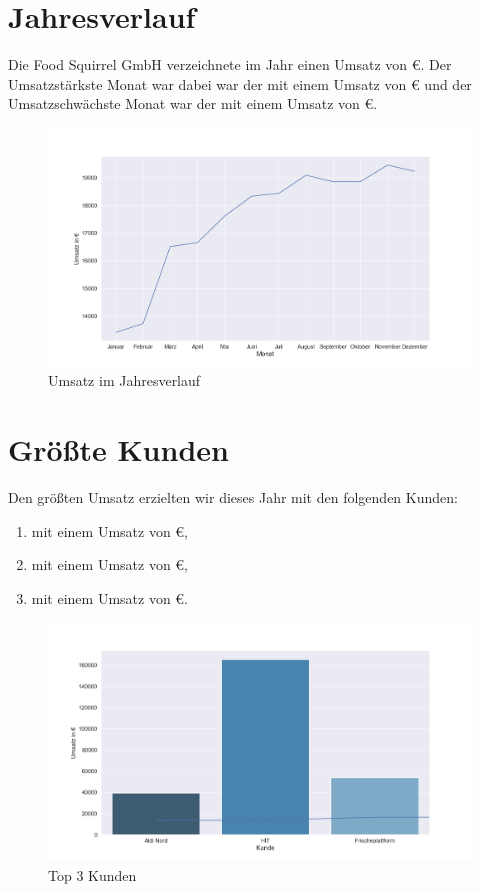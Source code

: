 \documentclass[10pt,a4paper]{article}
\author{Hannes Benne}
\begin{document}
\section*{Jahresverlauf}
Die Food Squirrel GmbH verzeichnete im Jahr \the\year{} einen Umsatz von  \euro{}. Der Umsatzstärkste Monat war dabei war der  mit einem Umsatz von  \euro{} und der Umsatzschwächste Monat war der  mit einem Umsatz von  \euro.
\begin{figure}[h]
\centering
    \includegraphics[width=1.\textwidth]{img/Jahresumsatz.png}
\caption{Umsatz im Jahresverlauf} 
\end{figure}

\section*{Größte Kunden}
Den größten Umsatz erzielten wir dieses Jahr mit den folgenden Kunden:
\begin{enumerate}
\item {} mit einem Umsatz von  \euro,
\item {} mit einem Umsatz von  \euro,
\item {} mit einem Umsatz von  \euro.
\end{enumerate}
\newpage

\begin{figure}[h]
\centering
    \includegraphics[width=1\textwidth]{img/top_kunden.png}
\caption{Top 3 Kunden} 
\end{figure}
\end{document}
